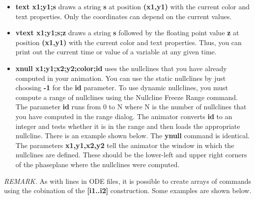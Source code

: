 \documentclass{article}
\begin{document}
\begin{itemize}
\item {\bf text x1;y1;s} draws a string {\bf s} at position {\bf
(x1,y1)} with the current color and text properties. Only the
coordinates can depend on the current values.

\item {\bf vtext x1;y1;s;z} draws a string {\bf s} followed by
the floating point value {\bf z} at position {\bf
(x1,y1)} with the current color and text properties. Thus, you can
print out the current time or value of a variable at any given time.

\item{\bf xnull x1;y1;x2;y2;color;id} uses the nullclines that you
have already computed in your animation.  You can use the static
nullclines by just choosing {\bf -1} for the {\bf id} parameter.  To
use dynamic nullclines, you must compute a range of nullclines using
the Nullcline Freeze Range command.  The parameter {\bf id} runs from
0 to N where N is the number of nullclines that you have computed in
the range dialog.  The animator converts {\bf id} to an integer and
tests whether it is in the range and then loads the appropriate
nullcline. There is an example shown below. The {\bf ynull} command is
identical. The parameters {\bf x1,y1,x2,y2} tell the animator the
window in which the nullclines are defined.  These should be the
lower-left and upper right corners of the phaseplane where the
nullclines were computed.

\end{itemize}

{\em REMARK.}  As with lines in ODE files, it is possible to create
arrays of commands using the cobination of the {\bf [i1..i2] }
construction. Some examples are shown below.
\end{document}
